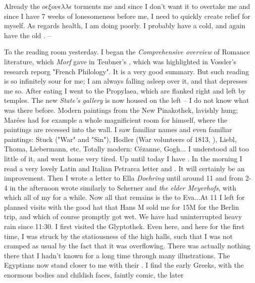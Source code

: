 
Already the $o\epsilon\xi o\nu\epsilon\lambda\lambda\epsilon$ torments me and since I don't want it to overtake me and since I have 7 weeks of lonesomeness before me, I need to quickly create relief for myself. As regards health, I am doing poorly. I probably have a cold, and again have the old . --

To the reading room yesterday. I began the \textit{Comprehensive overview} of Romance literature, which \textit{Morf} gave in Teubner's , which was highlighted in Vossler's research reporg "French Philology". It is a very good summary. But such reading is so infinitely sour for me; I am always falling asleep over it, and that depresses me so. After eating I went to the Propylaea, which are flanked right and left by temples. The new \textit{State's gallery} is now housed on the left -- I do not know what was there before. Modern paintings from the New Pinakothek, lavishly hung; Marées had for example a whole magnificient room for himself, where the paintings are recessed into the wall. I saw familiar names and even familiar paintings: Stuck ("War" and "Sin"), Hodler (War volunteers of 1813, ), Liebl, Thoma, Liebermann, etc. Totally modern: Cézanne, Gogh... I understood all too little of it, and went home very tired. \missing Up until today I have . In the morning I read a very lovely Latin and Italian Petrarca letter \missing and . It will certainly be an improvement. Then I wrote a  letter to Ella \textit{Doehring} until around 11 and from 2-4 in the afternoon wrote similarly to Scherner and \textit{the elder Meyerhofs}, with which all of my  for a while. Now all that remains is the  to Eva...At 11 I left for planned visits with the good hat that Hans M sold me for 15M for the Berlin trip, and which of course promptly got wet. We have had uninterrupted heavy rain since 11:30. I first visited the Glyptothek. Even here, and here for the first time, I was struck by the statiousness of the high halls, such that I was not cramped as usual by the fact that it was overflowing. There was actually nothing there that I hadn't known for a long time through many illustrations. The Egyptians now stand closer to me with their  . I find the early Greeks, with the enormous bodies and childish faces, faintly comic, the later 
 
